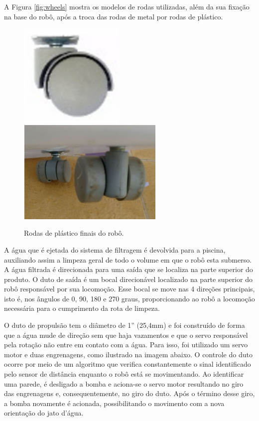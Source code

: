 A Figura \ref{fig:wheels} mostra os modelos de rodas utilizadas, além da
sua fixação na base do robô, após a troca das rodas de metal por rodas
de plástico.

\begin{figure}[h]
  \centering
	\includegraphics[height=5cm]{figuras/plastic-wheel.png}
	\quad
	\includegraphics[height=5cm]{figuras/plastic-wheels-base.png}
  \caption{Rodas de plástico finais do robô.}
  \label{fig:plastic-wheel-base}
\end{figure}
\FloatBarrier

A água que é ejetada do sistema de filtragem é devolvida para a piscina, auxiliando
assim a limpeza geral de todo o volume em que o robô esta submerso. A água filtrada
é direcionada para uma saída que se localiza na parte superior do produto. O duto
de saída é um bocal direcionável localizado na parte superior do robô responsável
por sua locomoção. Esse bocal se move nas 4 direções principais, isto é, nos ângulos
de 0, 90, 180 e 270 graus, proporcionando ao robô a locomoção necessária para o
cumprimento da rota de limpeza.

O duto de propulsão tem o diâmetro de 1” (25,4mm) e foi construído de forma que a
água mude de direção sem que haja vazamentos e que o servo responsável pela rotação
não entre em contato com a água. Para isso, foi utilizado um servo motor e duas
engrenagens, como ilustrado na imagem abaixo. O controle do duto ocorre por meio
de um algoritmo que verifica constantemente o sinal identificado pelo sensor de
distância enquanto o robô está se movimentando. Ao identificar uma parede, é
desligado a bomba e aciona-se o servo motor resultando no giro das engrenagens e,
consequentemente,  no giro do duto. Após o término desse giro, a bomba novamente
é acionada, possibilitando o movimento com a nova orientação do jato d’água.


